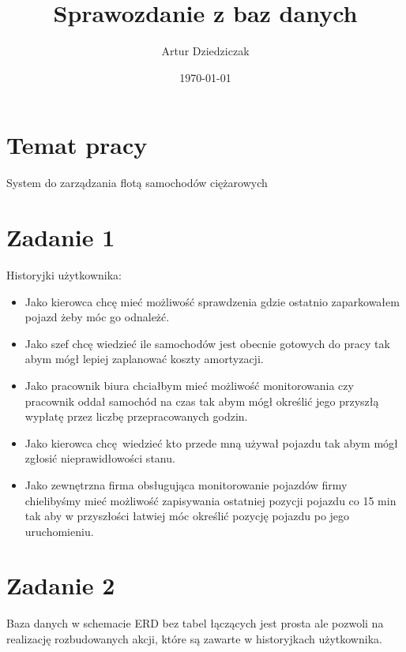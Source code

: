 \documentclass{article}
\title{Sprawozdanie z baz danych}
\author{Artur Dziedziczak}
\date{\today}
\begin{document}
\maketitle

\section{Temat pracy}

System do zarządzania flotą samochodów ciężarowych

\section{Zadanie 1}
 Historyjki użytkownika:

\begin{itemize}
    \item Jako kierowca chcę mieć możliwość sprawdzenia gdzie ostatnio zaparkowałem pojazd żeby móc go odnależć.
    \item Jako szef chcę wiedzieć ile samochodów jest obecnie gotowych do pracy tak abym mógł lepiej zaplanować koszty amortyzacji.
    \item Jako pracownik biura chciałbym mieć możliwość monitorowania czy pracownik oddał samochód na czas tak abym mógł określić jego przyszłą wypłatę przez liczbę przepracowanych godzin.
    \item Jako kierowca chcę wiedzieć kto przede mną używał pojazdu tak abym mógł zgłosić nieprawidłowości stanu.
    \item Jako zewnętrzna firma obsługująca monitorowanie pojazdów firmy chielibyśmy mieć możliwość zapisywania ostatniej pozycji pojazdu co 15 min tak aby w przyszłości łatwiej móc określić pozycję pojazdu po jego uruchomieniu.
\end{itemize}

\section{Zadanie 2}
Baza danych w schemacie ERD bez tabel łączących jest prosta ale pozwoli na 
realizację rozbudowanych akcji, które są zawarte w historyjkach użytkownika.
\end{document}
